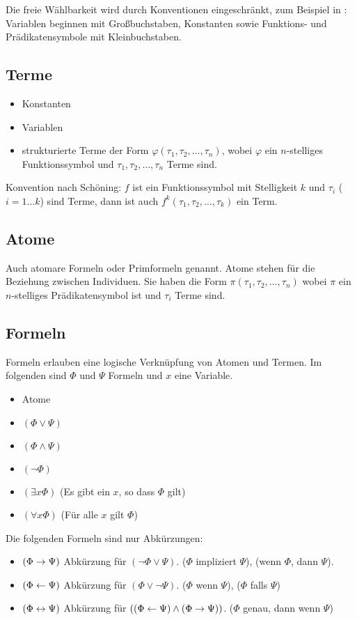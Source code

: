 \documentclass[a4paper]{scrartcl}
\begin{document}
Die freie Wählbarkeit wird durch Konventionen eingeschränkt, zum Beispiel in : Variablen beginnen mit Großbuchstaben, Konstanten sowie Funktions- und Prädikatensymbole mit Kleinbuchstaben.

\subsection{Terme}
\begin{itemize}
\item Konstanten
\item Variablen
\item strukturierte Terme der Form $\varphi(\tau_1,\tau_2,\ldots,\tau_n)$, wobei $\varphi$ ein $n$-stelliges Funktionssymbol und $\tau_1,\tau_2,\ldots,\tau_n$ Terme sind.
\end{itemize}

Konvention nach Schöning: $f$ ist ein Funktionssymbol mit Stelligkeit $k$ und $\tau_i$ ($i=1\ldots k$) sind Terme, dann ist auch $f^k(\tau_1,\tau_2,\ldots,\tau_k)$ ein Term.

\subsection{Atome}
Auch atomare Formeln oder Primformeln genannt. Atome stehen für die Beziehung zwischen Individuen. Sie haben die Form $\pi(\tau_1,\tau_2,\ldots,\tau_n)$ wobei $\pi$ ein $n$-stelliges Prädikatensymbol ist und $\tau_i$ Terme sind.

\subsection{Formeln}
Formeln erlauben eine logische Verknüpfung von Atomen und Termen. Im folgenden sind $\Phi$ und $\Psi$ Formeln und $x$ eine Variable.

\begin{itemize}
\item Atome
\item $(\Phi \vee \Psi)$
\item $(\Phi \wedge \Psi)$
\item $(\neg \Phi)$
\item $(\exists x \Phi)$ (\glqq Es gibt ein $x$, so dass $\Phi$ gilt\grqq)
\item $(\forall x \Phi)$ (\glqq Für alle $x$ gilt $\Phi$\grqq)
\end{itemize}

Die folgenden Formeln sind nur Abkürzungen:
\begin{itemize}
\item $(\Phi \rightarrow \Psi)$ Abkürzung für $(\neg \Phi \vee \Psi)$.
 (\glqq $\Phi$ impliziert $\Psi$\grqq), (\glqq wenn $\Phi$, dann $\Psi$\grqq).
\item $(\Phi \leftarrow \Psi)$ Abkürzung für $(\Phi \vee \neg \Psi)$. (\glqq $\Phi$ wenn $\Psi$\grqq), (\glqq $\Phi$ falls $\Psi$\grqq) 
\item $(\Phi \leftrightarrow \Psi)$ Abkürzung für $((\Phi \leftarrow \Psi)\wedge(\Phi\rightarrow\Psi))$. (\glqq $\Phi$ genau, dann wenn $\Psi$\grqq)
\end{itemize}
\end{document}

